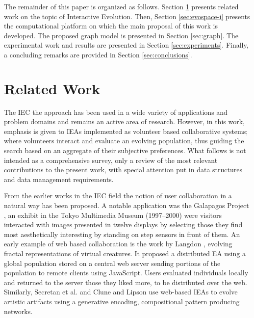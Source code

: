 \documentclass[conference]{IEEEtran}
\begin{document}
The remainder of this paper is organized as follows.
Section \ref{sec:interactive} presents related work on the topic 
of Interactive Evolution.
Then, Section \ref{sec:evospace-i} presents the computational platform on which 
the main proposal of this work is developed. The proposed graph model is 
presented in Section \ref{sec:graph}.
The experimental work and results are presented in Section \ref{sec:experiments}.
Finally, a concluding remarks are provided in Section \ref{sec:conclusions}.


\section{Related Work}
\label{sec:interactive}

The IEC the approach has been used in a wide variety of applications and problem domains
and remains an active area of research. However, in this work, emphasis is given to IEAs 
implemented as volunteer based collaborative systems; where volunteers interact and evaluate 
an evolving population, thus guiding the search based on an aggregate of their subjective 
preferences. What follows is not intended as a comprehensive survey, only a review of 
the most relevant contributions to the present work, with special attention put in
data structures and data management requirements.

From the earlier works in the IEC field the notion of user collaboration in a natural way
has been proposed. A notable application was the Galapagos Project \cite{sims1997interactivity},
an exhibit in the Tokyo Multimedia Museum (1997--2000) were visitors interacted with images presented in 
twelve displays by selecting those they find most aesthetically interesting by standing on
step sensors in front of them. An early example of web based collaboration is the work by 
Langdon \cite{langdon:2004}, evolving fractal representations of virtual creatures. It proposed a 
distributed EA using a global population stored on a central web server sending 
portions of the population to remote clients using JavaScript. Users evaluated individuals locally 
and returned to the server those they liked more, to be distributed over the web.
Similarly, Secretan et al. \cite{picbreeder} and Clune and Lipson \cite{forms} use web-based IEAs 
to evolve artistic artifacts using a generative encoding, compositional pattern producing networks.
\end{document}
